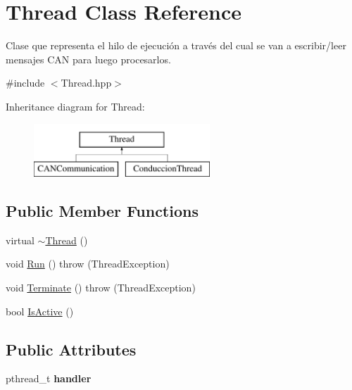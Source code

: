 \hypertarget{class_thread}{\section{\-Thread \-Class \-Reference}
\label{class_thread}
}


\-Clase que representa el hilo de ejecución a través del cual se van a escribir/leer mensajes \-C\-A\-N para luego procesarlos.  




{\ttfamily \#include $<$\-Thread.\-hpp$>$}

\-Inheritance diagram for \-Thread\-:\begin{figure}[H]
\begin{center}
\leavevmode
\includegraphics[height=2.000000cm]{class_thread}
\end{center}
\end{figure}
\subsection*{\-Public \-Member \-Functions}
\begin{DoxyCompactItemize}
\item 
virtual \hyperlink{class_thread_a37d9edd3a1a776cbc27dedff949c9726}{$\sim$\-Thread} ()
\item 
void \hyperlink{class_thread_a26c650bc1d2d290979a2f693569ab9c8}{\-Run} ()  throw (\-Thread\-Exception)
\item 
void \hyperlink{class_thread_a9a7979cfd00ccef6276a2ea47ed5a464}{\-Terminate} ()  throw (\-Thread\-Exception)
\item 
bool \hyperlink{class_thread_add375d7ae010c2297c01154b3cb84d32}{\-Is\-Active} ()
\end{DoxyCompactItemize}
\subsection*{\-Public \-Attributes}
\begin{DoxyCompactItemize}
\item 
\hypertarget{class_thread_a33f1a9a1e8b8797bb0ca17059f1c4dbc}{pthread\-\_\-t {\bfseries handler}}\label{class_thread_a33f1a9a1e8b8797bb0ca17059f1c4dbc}

\end{DoxyCompactItemize}
